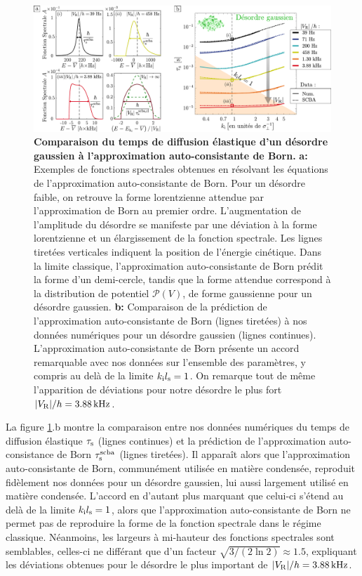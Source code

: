 \begin{figure}
\centering
\includegraphics[width=\textwidth]{Fig/TauS_NJP/SCBA_gauss.pdf}
\caption{\textbf{Comparaison du temps de diffusion élastique d'un désordre gaussien à l'approximation auto-consistante de Born.} \textbf{a:} Exemples de fonctions spectrales obtenues en résolvant les équations de l'approximation auto-consistante de Born. Pour un désordre faible, on retrouve la forme lorentzienne attendue par l'approximation de Born au premier ordre. L'augmentation de l'amplitude du désordre se manifeste par une déviation à la forme lorentzienne et un élargissement de la fonction spectrale. Les lignes tiretées verticales indiquent la position de l'énergie cinétique. Dans la limite classique, l'approximation auto-consistante de Born prédit la forme d'un demi-cercle, tandis que la forme attendue correspond à la distribution de potentiel $\mathcal{P}(V)$, de forme gaussienne pour un désordre gaussien. \textbf{b:} Comparaison de la prédiction de l'approximation auto-consistante de Born (lignes tiretées) à nos données numériques pour un désordre gaussien (lignes continues). L'approximation auto-consistante de Born présente un accord remarquable avec nos données sur l'ensemble des paramètres, y compris au delà de la limite $k_{\mathrm{i}}l_{\mathrm{s}}=1$. On remarque tout de même l'apparition de déviations pour notre désordre le plus fort $|V_{\mathrm{R}}|/h=\SI{3.88}{\kilo\hertz}$.}
\label{fig:SCBA_gauss}
\end{figure}


La figure \ref{fig:SCBA_gauss}.b montre la comparaison entre nos données numériques du temps de diffusion élastique $\tau_{\mathrm{s}}$ (lignes continues) et la prédiction de l'approximation auto-consistance de Born $\tau_{\mathrm{s}}^{\mathrm{scba}}$ (lignes tiretées). Il apparaît alors que l'approximation auto-consistante de Born, communément utilisée en matière condensée, reproduit fidèlement nos données pour un désordre gaussien, lui aussi largement utilisé en matière condensée. L'accord en d'autant plus marquant que celui-ci s'étend au delà de la limite $k_{\mathrm{i}}l_{\mathrm{s}}=1$, alors que l'approximation auto-consistante de Born ne permet pas de reproduire la forme de la fonction spectrale dans le régime classique. Néanmoins, les largeurs à mi-hauteur des fonctions spectrales sont semblables, celles-ci ne différant que d'un facteur $\sqrt{3/(2\ln 2)}\approx 1.5$, expliquant les déviations obtenues pour le désordre le plus important de $|V_{\mathrm{R}}|/h=\SI{3.88}{\kilo\hertz}$.









